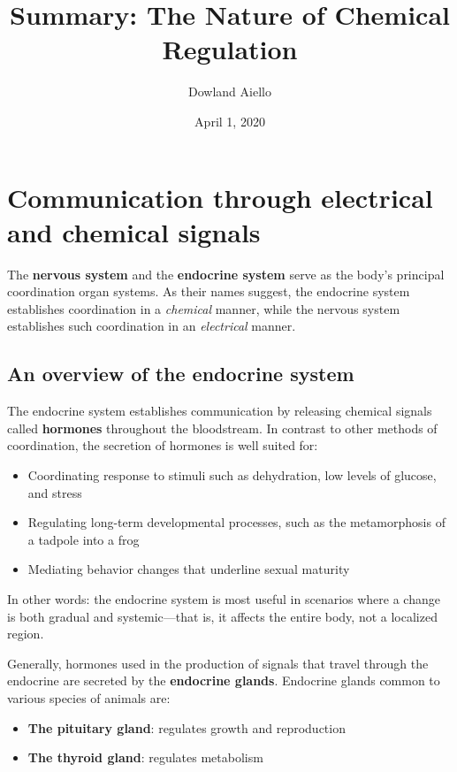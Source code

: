 \documentclass{article}
\begin{document}
\title{Summary: The Nature of Chemical Regulation}
\author{Dowland Aiello}
\date{April 1, 2020}

\maketitle
\tableofcontents
\fancyhf{}

\newpage

\section{Communication through electrical and chemical signals}

The \textbf{nervous system} and the \textbf{endocrine system} serve as the
body's principal coordination organ systems. As their names suggest, the
endocrine system establishes coordination in a \emph{chemical} manner, while the
nervous system establishes such coordination in an \emph{electrical} manner.

\subsection{An overview of the endocrine system}

The endocrine system establishes communication by releasing chemical signals
called \textbf{hormones} throughout the bloodstream. In contrast to other
methods of coordination, the secretion of hormones is well suited for:

\begin{itemize}
	\item Coordinating response to stimuli such as dehydration, low levels of glucose, and stress
	\item Regulating long-term developmental processes, such as the metamorphosis of a tadpole into a frog
	\item Mediating behavior changes that underline sexual maturity
\end{itemize}

In other words: the endocrine system is most useful in scenarios where a change
is both gradual and systemic---that is, it affects the entire body, not a
localized region.

Generally, hormones used in the production of signals that travel through the
endocrine are secreted by the \textbf{endocrine glands}. Endocrine glands common
to various species of animals are:

\begin{itemize}
	\item \textbf{The pituitary gland}: regulates growth and reproduction
	\item \textbf{The thyroid gland}: regulates metabolism
\end{itemize}
\end{document}
